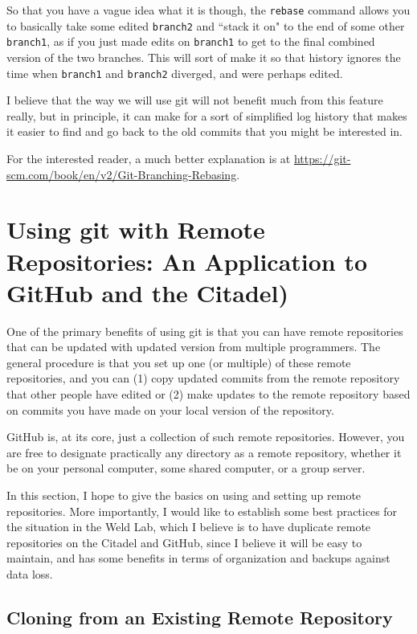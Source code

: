 \documentclass[11pt]{article}
\begin{document}
So that you have a vague idea what it is though, the \texttt{rebase} command allows you to basically take some edited \texttt{branch2} and ``stack it on" to the end of some other \texttt{branch1}, as if you just made edits on \texttt{branch1} to get to the final combined version of the two branches.  This will sort of make it so that history ignores the time when \texttt{branch1} and \texttt{branch2} diverged, and were perhaps edited.  

I believe that the way we will use git will not benefit much from this feature really, but in principle, it can make for a sort of simplified log history that makes it easier to find and go back to the old commits that you might be interested in.

For the interested reader, a much better explanation is at \url{https://git-scm.com/book/en/v2/Git-Branching-Rebasing}.

\section{Using git with Remote Repositories: An Application to GitHub and the Citadel)}

One of the primary benefits of using git is that you can have remote repositories that can be updated with updated version from multiple programmers.  The general procedure is that you set up one (or multiple) of these remote repositories, and you can (1) copy updated commits from the remote repository that other people have edited or (2) make updates to the remote repository based on commits you have made on your local version of the repository.

GitHub is, at its core, just a collection of such remote repositories.  However, you are free to designate practically any directory as a remote repository, whether it be on your personal computer, some shared computer, or a group server.

In this section, I hope to give the basics on using and setting up remote repositories.  More importantly, I would like to establish some best practices for the situation in the Weld Lab, which I believe is to have duplicate remote repositories on the Citadel and GitHub, since I believe it will be easy to maintain, and has some benefits in terms of organization and backups against data loss.

\subsection{Cloning from an Existing Remote Repository}
\end{document}
